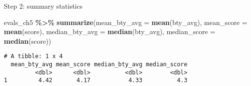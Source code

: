 \documentclass[
  ignorenonframetext,
]{beamer}
\newenvironment{Shaded}{\begin{snugshade}}{\end{snugshade}}
\newcommand{\AttributeTok}[1]{\textcolor[rgb]{0.13,0.29,0.53}{#1}}
\newcommand{\FunctionTok}[1]{\textcolor[rgb]{0.13,0.29,0.53}{\textbf{#1}}}
\newcommand{\NormalTok}[1]{#1}
\newcommand{\SpecialCharTok}[1]{\textcolor[rgb]{0.81,0.36,0.00}{\textbf{#1}}}
\begin{document}
\begin{frame}[fragile]{Step 2: summary statistics}
\protect\hypertarget{step-2-summary-statistics}{}
\small

\begin{Shaded}
\begin{Highlighting}[]
\NormalTok{evals\_ch5 }\SpecialCharTok{\%\textgreater{}\%}
  \FunctionTok{summarize}\NormalTok{(}\AttributeTok{mean\_bty\_avg =} \FunctionTok{mean}\NormalTok{(bty\_avg), }
            \AttributeTok{mean\_score =} \FunctionTok{mean}\NormalTok{(score),}
            \AttributeTok{median\_bty\_avg =} \FunctionTok{median}\NormalTok{(bty\_avg), }
            \AttributeTok{median\_score =} \FunctionTok{median}\NormalTok{(score))}
\end{Highlighting}
\end{Shaded}

\begin{verbatim}
# A tibble: 1 x 4
  mean_bty_avg mean_score median_bty_avg median_score
         <dbl>      <dbl>          <dbl>        <dbl>
1         4.42       4.17           4.33          4.3
\end{verbatim}
\end{frame}
\end{document}
